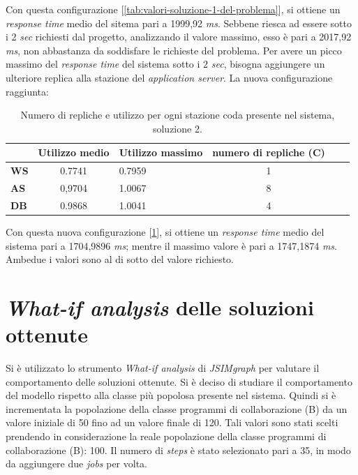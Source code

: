 \documentclass[../main.tex]{subfiles}
\begin{document}
    Con questa configurazione [\ref{tab:valori-soluzione-1-del-problema}], si ottiene un \textit{response time} medio del
    sitema pari a 1999,92 \textit{ms}.
    Sebbene riesca ad essere sotto i 2 \textit{sec} richiesti dal progetto, analizzando il valore massimo, esso è pari a
    2017,92 \textit{ms}, non abbastanza da soddisfare le richieste del problema.
    Per avere un picco massimo del \textit{response time} del sistema sotto i 2 \textit{sec}, bisogna aggiungere un
    ulteriore replica alla stazione del \textit{application server}.
    \newline
    La nuova configurazione raggiunta:

    \begin{table}[h]
        \centering
        \begin{tabular}{|l|c|l|c|l|c}
            \hline
            & \textbf{Utilizzo medio} & \textbf{Utilizzo massimo} & \textbf{numero di repliche (C)}  \\ [0.5ex]
            \hline
            \textbf{WS} & 0.7741                  & 0.7959                    & 1                               \\
            \textbf{AS} & 0,9704                  & 1.0067                    & 8                               \\
            \textbf{DB} & 0.9868                  & 1.0041                    & 4                               \\
            \hline
        \end{tabular}
        \caption{Numero di repliche e utilizzo per ogni stazione coda presente nel sistema, soluzione 2.}
        \label{tab:valori-soluzione-2-del-problema}
    \end{table}

    Con questa nuova configurazione [\ref{tab:valori-soluzione-2-del-problema}], si ottiene un \textit{response time}
    medio del sistema pari a 1704,9896 \textit{ms}; mentre il massimo valore è pari a 1747,1874 \textit{ms}.
    Ambedue i valori sono al di sotto del valore richiesto.


    \section{\textit{What-if analysis} delle soluzioni ottenute}\label{sec:what-if-analysis-delle-soluzioni-ottenute}
    Si è utilizzato lo strumento \textit{What-if analysis} di \textit{JSIMgraph} per valutare il comportamento delle
    soluzioni ottenute.
    Si è deciso di studiare il comportamento del modello rispetto alla classe più popolosa presente nel sistema.\newline
    Quindi si è incrementata la popolazione della classe programmi di collaborazione (B) da un valore iniziale di 50 fino ad
    un valore finale di 120.
    Tali valori sono stati scelti prendendo in considerazione la reale popolazione della classe programmi di
    collaborazione (B): 100.
    Il numero di \textit{steps} è stato selezionato pari a 35, in modo da aggiungere due \textit{jobs} per volta.
\end{document}

